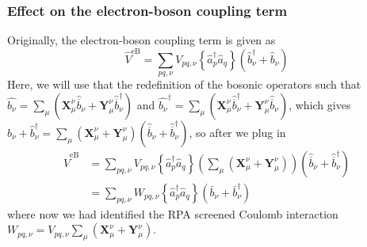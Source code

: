 \subsubsection{Effect on the electron-boson coupling term}
Originally, the electron-boson coupling term is given as
\begin{equation}
\hat{V}^{\mathrm{eB}}=\sum_{p q, \nu} V_{p q, \nu}\left\{\hat{a}_p^{\dagger} \hat{a}_q\right\}\left(\hat{b}_\nu^{\dagger}+\hat{b}_\nu\right)
\end{equation}
Here, we will use that the redefinition of the bosonic operators such that $\hat{b_\nu} = \sum_\mu \left(\mathbf{X}_{\mu}^{\nu} \hat{\overline{b}}_\nu + \mathbf{Y}_{\mu}^{\nu} \hat{\overline{b}}_\nu^{\dagger}\right)$ and $\hat{b_\nu}^\dagger = \sum_\mu \left(\mathbf{X}_{\mu}^{\nu} \hat{\overline{b}}_\nu^\dagger + \mathbf{Y}_{\mu}^{\nu} \hat{\overline{b}}_\nu\right)$, which gives $\hat{b}_\nu + \hat{b}_{\nu}^\dagger = \sum_\mu \left(\mathbf{X}_{\mu}^{\nu} + \mathbf{Y}_{\mu}^{\nu}\right) \left(\hat{\overline{b}}_\nu + \hat{\overline{b}}_\nu^\dagger\right)$, so after we plug in
\begin{align}
\hat{V}^{\mathrm{eB}}&=\sum_{p q, \nu} V_{p q, \nu}\left\{\hat{a}_p^{\dagger} \hat{a}_q\right\}\left(\sum_\mu \left(\mathbf{X}_{\mu}^{\nu}  + \mathbf{Y}_{\mu}^{\nu} \right) \right)\left(\hat{\overline{b}}_\nu + \hat{\overline{b}}_\nu^\dagger\right) \\
&= \sum_{p q, \nu} W_{p q, \nu} \left\{ \hat{a}_p^{\dagger} \hat{a}_q \right\}\left(\bar{b}_\nu+\bar{b}_\nu^{\dagger}\right)
\end{align}
where now we had identified the RPA screened Coulomb interaction $W_{p q, \nu} = V_{p q, \nu} \sum_\mu\left(\mathbf{X}_{\mu}^{\nu} + \mathbf{Y}_{\mu}^{\nu}\right)$. 

